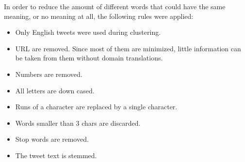 \documentclass[journal]{IEEEtran}
\begin{document}
In order to reduce the amount of different words that could have the same meaning, or no meaning at all, the following rules were applied:

\begin{itemize}
  \item Only English tweets were used during clustering.
  \item \ac{URL} are removed. Since most of them are minimized, little information can be taken from them without domain translations.
  \item Numbers are removed.
  \item All letters are down cased.
  \item Runs of a character are replaced by a single character.
  \item Words smaller than 3 chars are discarded.
  \item Stop words are removed. 
  \item The tweet text is stemmed.
\end{itemize}
\end{document}
